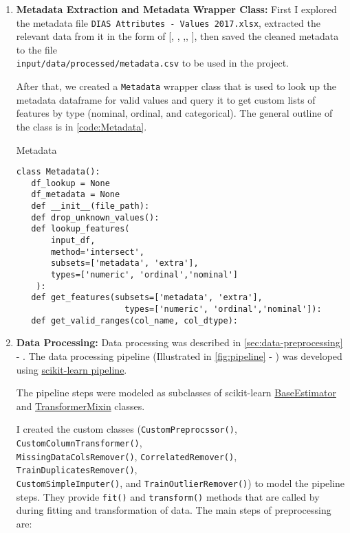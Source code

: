 \documentclass[a4paper]{article}
\begin{document}
{    \begin{enumerate}
    \item \textbf{Metadata Extraction and Metadata Wrapper Class:} First I explored the metadata file \texttt{DIAS Attributes - Values 2017.xlsx}, extracted the relevant data from it in the form of [, , ,, ], then saved the cleaned metadata  to the file \\
      \texttt{input/data/processed/metadata.csv} to be used in the project.

      After that, we created a \texttt{Metadata} wrapper class that is used to look up the metadata dataframe for valid values and query it to get custom lists of features by type (nominal, ordinal, and categorical).
      The general outline of the class is in \autoref{code:Metadata}.

      \begin{listing}[H]
        \caption{Metadata}
        \label{code:Metadata}
        \begin{verbatim}
class Metadata():
   df_lookup = None
   df_metadata = None
   def __init__(file_path):
   def drop_unknown_values():
   def lookup_features( 
       input_df,
       method='intersect', 
       subsets=['metadata', 'extra'], 
       types=['numeric', 'ordinal','nominal']
    ):
   def get_features(subsets=['metadata', 'extra'],
                      types=['numeric', 'ordinal','nominal']):
   def get_valid_ranges(col_name, col_dtype):
        \end{verbatim}
      \end{listing}
    \item \textbf{Data Processing:} Data processing was described in \autoref{sec:data-preprocessing} - .
      The data processing pipeline (Illustrated in \autoref{fig:pipeline} - ) was developed using \href{https://scikit-learn.org/stable/modules/generated/sklearn.pipeline.Pipeline.html}{scikit-learn pipeline}.

      The pipeline steps were modeled as subclasses of scikit-learn \href{https://scikit-learn.org/stable/modules/generated/sklearn.base.BaseEstimator.html}{BaseEstimator} and \href{https://scikit-learn.org/stable/modules/generated/sklearn.base.TransformerMixin.html}{TransformerMixin} classes.

      I created the custom classes (\texttt{CustomPreprocssor()}, \texttt{CustomColumnTransformer()},\\
      \texttt{MissingDataColsRemover()}, \texttt{CorrelatedRemover()}, \texttt{TrainDuplicatesRemover()}, \\
      \texttt{CustomSimpleImputer()}, and \texttt{TrainOutlierRemover()})  to model the pipeline steps. They provide \texttt{fit()} and \texttt{transform()} methods that are called by  during fitting and transformation of data. The main steps of preprocessing are:


\end{enumerate}}
\end{document}
